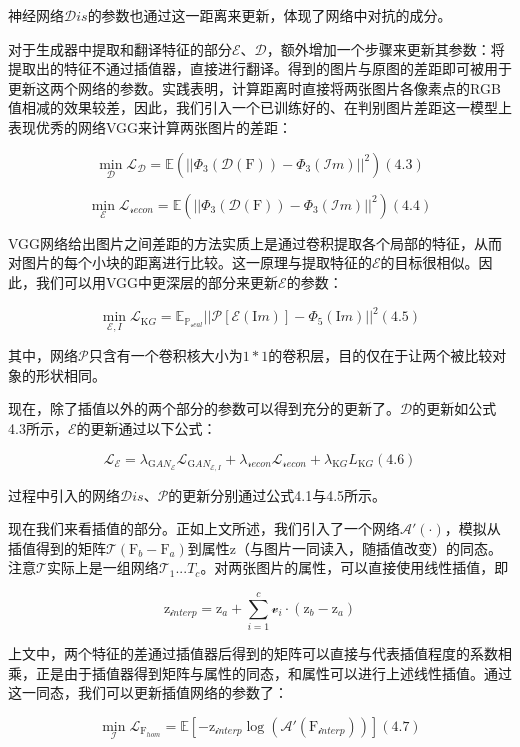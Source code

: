 \documentclass[UTF8,a4paper，12pt]{article}
\def\MC {\mathcal}
\theoremstyle{theorem}
\theoremstyle{definition}
\begin{document}
神经网络$\MC Dis$的参数也通过这一距离来更新，体现了网络中对抗的成分。

对于生成器中提取和翻译特征的部分$\MC E$、$\MC D$，额外增加一个步骤来更新其参数：将提取出的特征不通过插值器，直接进行翻译。得到的图片与原图的差距即可被用于更新这两个网络的参数。实践表明，计算距离时直接将两张图片各像素点的RGB值相减的效果较差，因此，我们引入一个已训练好的、在判别图片差距这一模型上表现优秀的网络VGG来计算两张图片的差距：

$$\min_{\MC D} \MC L_{\MC D} = \mathbb E(||\Phi_3(\MC D(\mathrm F)) - \Phi_3(\MC Im)||^2)    (4.3)$$

$$\min_{\MC E} \MC L_{\MC recon} = \mathbb E(||\Phi_3(\MC D(\mathrm F)) - \Phi_3(\MC Im)||^2)    (4.4)$$

VGG网络给出图片之间差距的方法实质上是通过卷积提取各个局部的特征，从而对图片的每个小块的距离进行比较。这一原理与提取特征的$\MC E$的目标很相似。因此，我们可以用VGG中更深层的部分来更新$\MC E$的参数：

$$\min_{\MC E,I} \MC L_{\mathrm KG} = \mathbb E_{\mathbb P_{\MC real}}||\MC P[\MC E(\mathrm Im)] - \Phi_5(\mathrm Im)||^2    (4.5)$$

其中，网络$\MC P$只含有一个卷积核大小为$1*1$的卷积层，目的仅在于让两个被比较对象的形状相同。

现在，除了插值以外的两个部分的参数可以得到充分的更新了。$\MC D$的更新如公式4.3所示，$\MC E$的更新通过以下公式：

$$\MC L_{\MC E} = \lambda_{\mathrm GAN_{\MC E}}\MC L_{\mathrm GAN_{\MC E,I}} + \lambda_{\MC recon}\MC L_{\MC recon} + \lambda_{\mathrm KG}L_{\mathrm KG}    (4.6)$$

过程中引入的网络$\MC Dis$、$\MC P$的更新分别通过公式4.1与4.5所示。

现在我们来看插值的部分。正如上文所述，我们引入了一个网络$\MC A'(\cdot)$，模拟从插值得到的矩阵$\MC T(\mathrm F_b - \mathrm F_a)$到属性$\mathrm z$（与图片一同读入，随插值改变）的同态。注意$\MC T$实际上是一组网络$\MC T_1...T_c$。对两张图片的属性，可以直接使用线性插值，即

$$\mathrm z_{\MC interp} = \mathrm z_a + \sum_{i=1}^{c}{\MC v_i \cdot (\mathrm z_b - \mathrm z_a)}$$

上文中，两个特征的差通过插值器后得到的矩阵可以直接与代表插值程度的系数相乘，正是由于插值器得到矩阵与属性的同态，和属性可以进行上述线性插值。通过这一同态，我们可以更新插值网络的参数了：

$$\min_ {\MC I} \MC L_{\mathrm F_{hom}} = \mathbb E [-\mathrm z_{\MC interp}\log(\MC A'(\mathrm F_{\MC interp}))]    (4.7)$$
\end{document}
